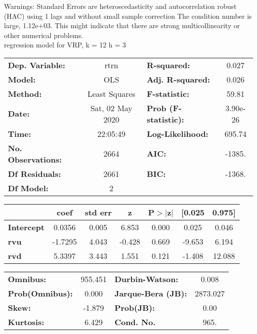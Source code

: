 Warnings: \newline
 [1] Standard Errors are heteroscedasticity and autocorrelation robust (HAC) using 1 lags and without small sample correction \newline
 [2] The condition number is large, 1.12e+03. This might indicate that there are \newline
 strong multicollinearity or other numerical problems.\\ 

regression model for VRP, k = 12 h = 3\begin{center}
\begin{tabular}{lclc}
\toprule
\textbf{Dep. Variable:}    &       rtrn       & \textbf{  R-squared:         } &     0.027   \\
\textbf{Model:}            &       OLS        & \textbf{  Adj. R-squared:    } &     0.026   \\
\textbf{Method:}           &  Least Squares   & \textbf{  F-statistic:       } &     59.81   \\
\textbf{Date:}             & Sat, 02 May 2020 & \textbf{  Prob (F-statistic):} &  3.90e-26   \\
\textbf{Time:}             &     22:05:49     & \textbf{  Log-Likelihood:    } &    695.74   \\
\textbf{No. Observations:} &        2664      & \textbf{  AIC:               } &    -1385.   \\
\textbf{Df Residuals:}     &        2661      & \textbf{  BIC:               } &    -1368.   \\
\textbf{Df Model:}         &           2      & \textbf{                     } &             \\
\bottomrule
\end{tabular}
\begin{tabular}{lcccccc}
                   & \textbf{coef} & \textbf{std err} & \textbf{z} & \textbf{P$> |$z$|$} & \textbf{[0.025} & \textbf{0.975]}  \\
\midrule
\textbf{Intercept} &       0.0356  &        0.005     &     6.853  &         0.000        &        0.025    &        0.046     \\
\textbf{rvu}       &      -1.7295  &        4.043     &    -0.428  &         0.669        &       -9.653    &        6.194     \\
\textbf{rvd}       &       5.3397  &        3.443     &     1.551  &         0.121        &       -1.408    &       12.088     \\
\bottomrule
\end{tabular}
\begin{tabular}{lclc}
\textbf{Omnibus:}       & 955.451 & \textbf{  Durbin-Watson:     } &    0.008  \\
\textbf{Prob(Omnibus):} &   0.000 & \textbf{  Jarque-Bera (JB):  } & 2873.027  \\
\textbf{Skew:}          &  -1.879 & \textbf{  Prob(JB):          } &     0.00  \\
\textbf{Kurtosis:}      &   6.429 & \textbf{  Cond. No.          } &     965.  \\
\bottomrule
\end{tabular}
\end{center}

